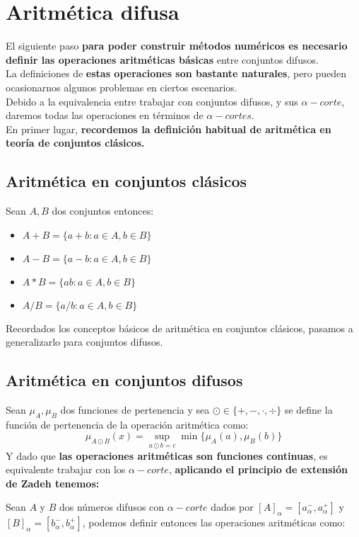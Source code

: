 \section{Aritmética difusa}
El siguiente paso \textbf{para poder construir métodos numéricos es necesario definir las operaciones aritméticas básicas} entre conjuntos difusos.\\
La definiciones de \textbf{estas operaciones son bastante naturales}, pero pueden ocasionarnos algunos problemas en ciertos escenarios.\\
Debido a la equivalencia entre trabajar con conjuntos difusos, y sus $\alpha-corte$, daremos todas las operaciones en términos de $\alpha-cortes$.\\
En primer lugar, \textbf{recordemos la definición habitual de aritmética en teoría de conjuntos clásicos.}

\subsection{Aritmética en conjuntos clásicos}
Sean $A, B$ dos conjuntos entonces:
\begin{itemize}
	\item $A+B=\{a+b : a \in A, b\in B\}$
	\item $A - B =\{a - b : a \in A, b\in B\}$
	\item $A * B =\{ab : a \in A, b\in B\}$
	\item $A / B =\{a/b : a \in A, b\in B\}$
\end{itemize}

Recordados los conceptos básicos de aritmética en conjuntos clásicos, pasamos a generalizarlo para conjuntos difusos.

\subsection{Aritmética en conjuntos difusos}
Sean $\mu_A, \mu_B$ dos funciones de pertenencia y sea $\odot \in \{+, -, \cdot, \div\}$ se define la función de pertenencia de la operación aritmética como:
$$
\mu_{A \odot B}(x) = \sup_{a \odot b = c} \min\{\mu_A(a), \mu_B(b)\}
$$
Y dado que \textbf{las operaciones aritméticas son funciones continuas}, es equivalente trabajar con los $\alpha-corte$, \textbf{aplicando el principio de extensión de Zadeh tenemos:}

Sean $A$ y $B$ dos números difusos con $\alpha-corte$ dados por $[A]_\alpha=[a_\alpha^-, a_\alpha^+]$ y $[B]_\alpha=[b_\alpha^-, b_\alpha^+]$, podemos definir entonces las operaciones aritméticas como:

